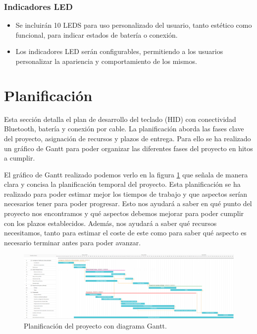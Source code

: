 \subsubsection{Indicadores \gls{LED}}
\begin{itemize}
\item Se incluirán 10 \gls{LED}S para uso personalizado del usuario, tanto estético como funcional, para indicar estados de batería o conexión.
\item Los indicadores \gls{LED} serán configurables, permitiendo a los usuarios personalizar la apariencia y comportamiento de los mismos.
\end{itemize}

\section{Planificación}

Esta sección detalla el plan de desarrollo del teclado (\gls{HID}) con conectividad \gls{Bluetooth}, batería y conexión por cable. La planificación aborda las fases clave del proyecto, asignación de recursos y plazos de entrega. Para ello se ha realizado un gráfico de Gantt para poder organizar las diferentes fases del proyecto en hitos a cumplir.

El gráfico de Gantt realizado podemos verlo en la figura \ref{fig:DiagramaGantt} que señala de manera clara y concisa la planificación temporal del proyecto. Esta planificación se ha realizado para poder estimar mejor los tiempos de trabajo y que aspectos serían necesarios tener para poder progresar. Esto nos ayudará a saber en qué punto del proyecto nos encontramos y qué aspectos debemos mejorar para poder cumplir con los plazos establecidos. Además, nos ayudará a saber qué recursos necesitamos, tanto para estimar el coste de este como para saber qué aspecto es necesario terminar antes para poder avanzar.

\begin{figure}
\centering
\includegraphics[width=\textheight]{imagenes/Capitulos/Cap02/DiagramaGantt.png}
\caption{Planificación del proyecto con diagrama Gantt.}
\label{fig:DiagramaGantt}
\end{figure}
